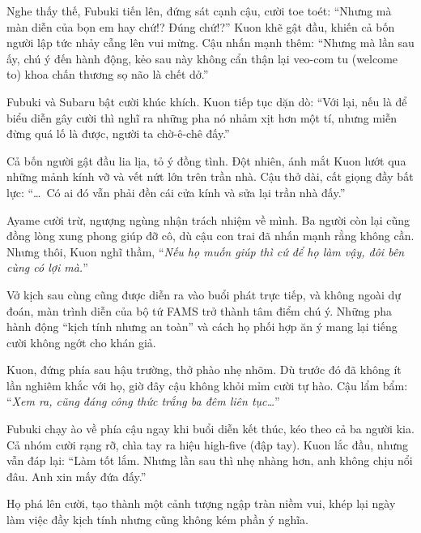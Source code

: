 \documentclass[../main.tex]{subfiles}
\begin{document}
Nghe thấy thế, Fubuki tiến lên, đứng sát cạnh cậu, cười toe toét: ``Nhưng mà màn diễn của bọn em hay chứ!? Đúng chứ!?'' Kuon khẽ gật đầu, khiến cả bốn người lập tức nhảy cẫng lên vui mừng. Cậu nhấn mạnh thêm: ``Nhưng mà lần sau ấy, chú ý đến hành động, kẻo sau này không cẩn thận lại veo-com tu (welcome to) khoa chấn thương sọ não là chết dở.''

Fubuki và Subaru bật cười khúc khích. Kuon tiếp tục dặn dò: ``Với lại, nếu là để biểu diễn gây cười thì nghĩ ra những pha nó nhảm xịt hơn một tí, nhưng miễn đừng quá lố là được, người ta chờ-ê-chê đấy.''

Cả bốn người gật đầu lia lịa, tỏ ý đồng tình. Đột nhiên, ánh mắt Kuon lướt qua những mảnh kính vỡ và vết nứt lớn trên trần nhà. Cậu thở dài, cất giọng đầy bất lực: ``\dots\ Có ai đó vẫn phải đền cái cửa kính và sửa lại trần nhà đấy.''

Ayame cười trừ, ngượng ngùng nhận trách nhiệm về mình. Ba người còn lại cũng đồng lòng xung phong giúp đỡ cô, dù cậu con trai đã nhấn mạnh rằng không cần. Nhưng thôi, Kuon nghĩ thầm, ``\textit{Nếu họ muốn giúp thì cứ để họ làm vậy, đôi bên cùng có lợi mà.}''

\ct

Vở kịch sau cùng cũng được diễn ra vào buổi phát trực tiếp, và không ngoài dự đoán, màn trình diễn của bộ tứ FAMS trở thành tâm điểm chú ý. Những pha hành động ``kịch tính nhưng an toàn'' và cách họ phối hợp ăn ý mang lại tiếng cười không ngớt cho khán giả.

Kuon, đứng phía sau hậu trường, thở phào nhẹ nhõm. Dù trước đó đã không ít lần nghiêm khắc với họ, giờ đây cậu không khỏi mỉm cười tự hào. Cậu lẩm bẩm: ``\textit{Xem ra, cũng đáng công thức trắng ba đêm liên tục\dots}''

Fubuki chạy ào về phía cậu ngay khi buổi diễn kết thúc, kéo theo cả ba người kia. Cả nhóm cười rạng rỡ, chìa tay ra hiệu high-five (đập tay). Kuon lắc đầu, nhưng vẫn đáp lại: ``Làm tốt lắm. Nhưng lần sau thì nhẹ nhàng hơn, anh không chịu nổi đâu. Anh xin mấy đứa đấy.''

Họ phá lên cười, tạo thành một cảnh tượng ngập tràn niềm vui, khép lại ngày làm việc đầy kịch tính nhưng cũng không kém phần ý nghĩa.
\end{document}
